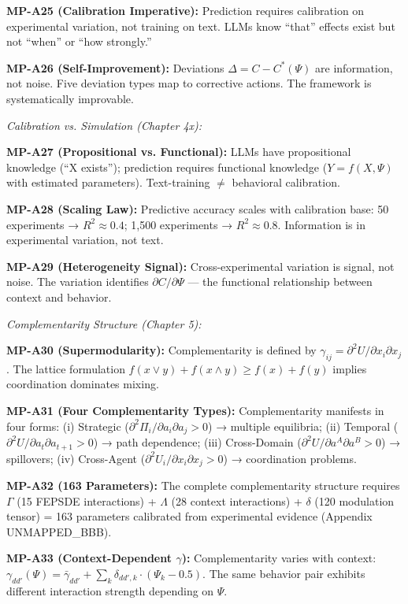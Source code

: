 \begin{tcolorbox}[colback=gray!5!white, colframe=gray!75!black,
    title=\textbf{MP Axioms}]
\textbf{MP-A25 (Calibration Imperative):} Prediction requires calibration on experimental variation, not training on text. LLMs know ``that'' effects exist but not ``when'' or ``how strongly.''

\textbf{MP-A26 (Self-Improvement):} Deviations $\Delta = C - C^*(\Psi)$ are information, not noise. Five deviation types map to corrective actions. The framework is systematically improvable.

\vspace{0.5em}
\textit{Calibration vs. Simulation (Chapter 4x):}

\textbf{MP-A27 (Propositional vs. Functional):} LLMs have propositional knowledge (``X exists''); prediction requires functional knowledge ($Y = f(X, \Psi)$ with estimated parameters). Text-training $\neq$ behavioral calibration.

\textbf{MP-A28 (Scaling Law):} Predictive accuracy scales with calibration base: 50 experiments → $R^2 \approx 0.4$; 1,500 experiments → $R^2 \approx 0.8$. Information is in experimental variation, not text.

\textbf{MP-A29 (Heterogeneity Signal):} Cross-experimental variation is signal, not noise. The variation identifies $\partial C / \partial \Psi$ --- the functional relationship between context and behavior.

\vspace{0.5em}
\textit{Complementarity Structure (Chapter 5):}

\textbf{MP-A30 (Supermodularity):} Complementarity is defined by $\gamma_{ij} = \partial^2 U / \partial x_i \partial x_j$. The lattice formulation $f(x \vee y) + f(x \wedge y) \geq f(x) + f(y)$ implies coordination dominates mixing.

\textbf{MP-A31 (Four Complementarity Types):} Complementarity manifests in four forms: (i) Strategic ($\partial^2 \Pi_i/\partial a_i \partial a_j > 0$) → multiple equilibria; (ii) Temporal ($\partial^2 U/\partial a_t \partial a_{t+1} > 0$) → path dependence; (iii) Cross-Domain ($\partial^2 U/\partial a^A \partial a^B > 0$) → spillovers; (iv) Cross-Agent ($\partial^2 U_i/\partial x_i \partial x_j > 0$) → coordination problems.

\textbf{MP-A32 (163 Parameters):} The complete complementarity structure requires $\Gamma$ (15 FEPSDE interactions) + $\Lambda$ (28 context interactions) + $\delta$ (120 modulation tensor) = 163 parameters calibrated from experimental evidence (Appendix UNMAPPED_BBB).

\textbf{MP-A33 (Context-Dependent $\gamma$):} Complementarity varies with context: $\gamma_{dd'}(\Psi) = \bar{\gamma}_{dd'} + \sum_k \delta_{dd',k} \cdot (\Psi_k - 0.5)$. The same behavior pair exhibits different interaction strength depending on $\Psi$.


\end{tcolorbox}
